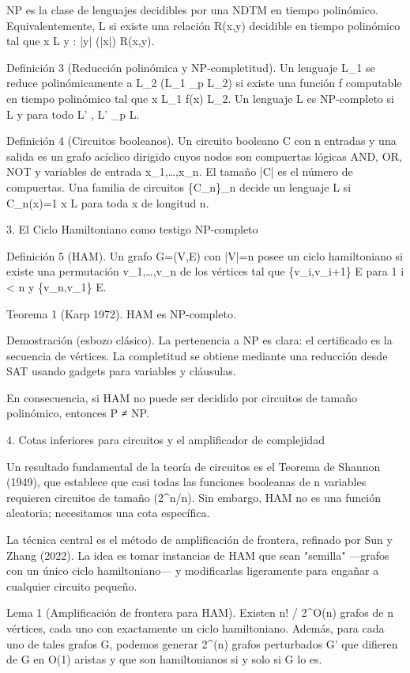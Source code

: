 \documentclass[12pt,a4paper]{book}
\begin{document}
NP es la clase de lenguajes decidibles por una NDTM en tiempo polinómico. Equivalentemente, L \in {} si existe una relación R(x,y) decidible en tiempo polinómico tal que x \in L \iff \exists y : |y| \le {}(|x|) \land R(x,y).

Definición 3 (Reducción polinómica y NP-completitud). Un lenguaje L_1 se reduce polinómicamente a L_2 (L_1 \le_p L_2) si existe una función f computable en tiempo polinómico tal que x \in L_1 \iff f(x) \in L_2. Un lenguaje L es NP-completo si L \in {} y para todo L' \in {}, L' \le_p L.

Definición 4 (Circuitos booleanos). Un circuito booleano C con n entradas y una salida es un grafo acíclico dirigido cuyos nodos son compuertas lógicas AND, OR, NOT y variables de entrada x_1,\dots,x_n. El tamaño |C| es el número de compuertas. Una familia de circuitos \{C_n\}_{n \in {}} decide un lenguaje L si C_n(x)=1 \iff x \in L para toda x de longitud n.

3. El Ciclo Hamiltoniano como testigo NP-completo

Definición 5 (HAM). Un grafo G=(V,E) con |V|=n posee un ciclo hamiltoniano si existe una permutación v_1,\dots,v_n de los vértices tal que \{v_i,v_{i+1}\} \in E para 1 \le i < n y \{v_n,v_1\} \in E.

Teorema 1 (Karp 1972). HAM es NP-completo.

Demostración (esbozo clásico). La pertenencia a NP es clara: el certificado es la secuencia de vértices. La completitud se obtiene mediante una reducción desde SAT usando gadgets para variables y cláusulas.

En consecuencia, si HAM no puede ser decidido por circuitos de tamaño polinómico, entonces P ≠ NP.

4. Cotas inferiores para circuitos y el amplificador de complejidad

Un resultado fundamental de la teoría de circuitos es el Teorema de Shannon (1949), que establece que casi todas las funciones booleanas de n variables requieren circuitos de tamaño \Omega(2^n/n). Sin embargo, HAM no es una función aleatoria; necesitamos una cota específica.

La técnica central es el método de amplificación de frontera, refinado por Sun y Zhang (2022). La idea es tomar instancias de HAM que sean "semilla" —grafos con un único ciclo hamiltoniano— y modificarlas ligeramente para engañar a cualquier circuito pequeño.

Lema 1 (Amplificación de frontera para HAM). Existen \ge n! / 2^{O(n)} grafos de n vértices, cada uno con exactamente un ciclo hamiltoniano. Además, para cada uno de tales grafos G, podemos generar 2^{\Omega(n)} grafos perturbados G' que difieren de G en O(1) aristas y que son hamiltonianos si y solo si G lo es.
\end{document}
